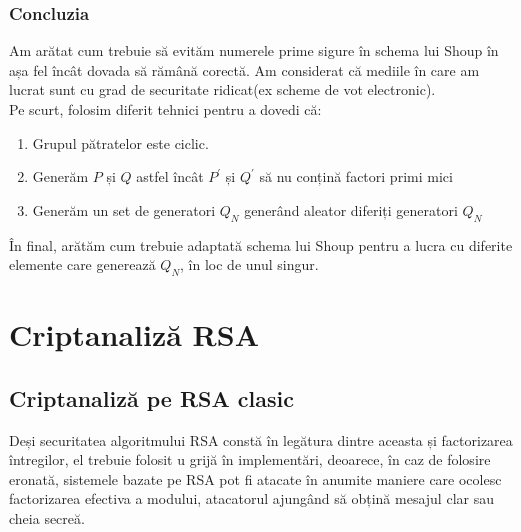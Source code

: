 \documentclass[12pt, oneside]{book}
\begin{document}
\subsection{Concluzia}
Am arătat cum trebuie să evităm numerele prime sigure în schema lui Shoup în așa fel încât dovada să rămână corectă. Am considerat că mediile în care am lucrat sunt cu grad de securitate ridicat(ex scheme de vot electronic).
\\ Pe scurt, folosim diferit tehnici pentru a dovedi că:
\begin{enumerate}
\item Grupul pătratelor este ciclic.

\item Generăm $P$ și $Q$ astfel încât $P^{'}$ și $Q^{'}$ să nu conțină factori primi mici

\item Generăm un set de generatori $Q_N$ generând aleator diferiți generatori $Q_N$
\end{enumerate} 
În final, arătăm cum trebuie adaptată schema lui Shoup pentru a lucra cu diferite elemente care generează $Q_N$, în loc de unul singur.


\chapter{Criptanaliză RSA}
\section{Criptanaliză pe RSA clasic}
Deși securitatea algoritmului RSA constă în legătura dintre aceasta și factorizarea întregilor, el trebuie folosit u grijă în implementări, deoarece, în caz de folosire eronată, sistemele bazate pe RSA pot fi atacate în anumite maniere care ocolesc factorizarea efectiva a modului, atacatorul ajungând să obțină mesajul clar sau cheia secreă.
\end{document}
